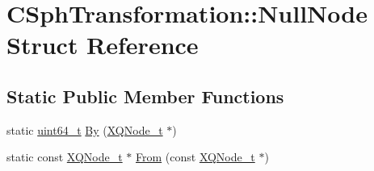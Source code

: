 \hypertarget{structCSphTransformation_1_1NullNode}{\section{C\-Sph\-Transformation\-:\-:Null\-Node Struct Reference}
\label{structCSphTransformation_1_1NullNode}
}
\subsection*{Static Public Member Functions}
\begin{DoxyCompactItemize}
\item 
static \hyperlink{sphinxstd_8h_aaa5d1cd013383c889537491c3cfd9aad}{uint64\-\_\-t} \hyperlink{structCSphTransformation_1_1NullNode_aae28d420f018e01102052073b8ed3408}{By} (\hyperlink{structXQNode__t}{X\-Q\-Node\-\_\-t} $\ast$)
\item 
static const \hyperlink{structXQNode__t}{X\-Q\-Node\-\_\-t} $\ast$ \hyperlink{structCSphTransformation_1_1NullNode_abe9727ef1ac84a29de54e9e8019199be}{From} (const \hyperlink{structXQNode__t}{X\-Q\-Node\-\_\-t} $\ast$)
\end{DoxyCompactItemize}



